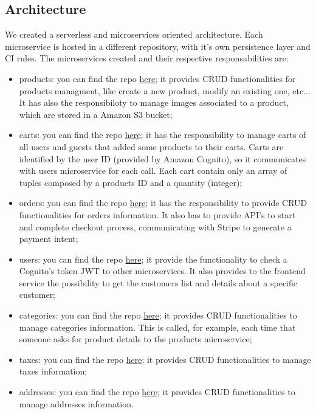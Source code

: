 \subsection{Architecture}
We created a serverless and microservices oriented architecture. Each microservice is hosted in a different repository, with it's own persistence layer and CI rules.
The microservices created and their respective responsabilities are:
\begin{itemize}
    \item products: you can find the repo \href{https://github.com/SWException/products}{here}; it provides CRUD functionalities for products managment,
                    like create a new product, modify an existing one, etc... It has also the responsibiloty to manage images associated to a product, which are 
                    stored in a Amazon S3 bucket;
    \item carts: you can find the repo \href{https://github.com/SWException/carts}{here}; it has the responsibility to manage carts of all users and guests that
                 added some products to their carts. Carts are identified by the user ID (provided by Amazon Cognito), so it communicates with users microservice for each call.
                 Each cart contain only an array of tuples composed by a products ID and a quantity (integer);
    \item orders: you can find the repo \href{https://github.com/SWException/orders}{here}; it has the responsibility to provide CRUD functionalities for orders information.
                  It also has to provide API's to start and complete checkout process, communicating with Stripe to generate a payment intent;
    \item users: you can find the repo \href{https://github.com/SWException/users}{here}; it provide the functionality to check a Cognito's token JWT to other microservices.
                 It also provides to the frontend service the possibility to get the customers list and details about a specific customer;
    \item categories: you can find the repo \href{https://github.com/SWException/categories}{here}; it provides CRUD functionalities to manage categories information.
                      This is called, for example, each time that someone asks for product details to the products microservice;
    \item taxes: you can find the repo \href{https://github.com/SWException/taxes}{here}; it provides CRUD functionalities to manage taxes information;
    \item addresses: you can find the repo \href{https://github.com/SWException/addresses}{here}; it provides CRUD functionalities to manage addresses information.
\end{itemize}

